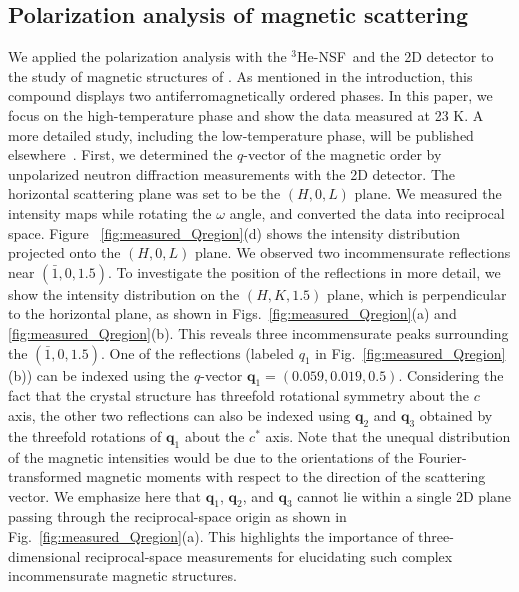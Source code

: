 \documentclass[%
 reprint,
superscriptaddress,
 amsmath,amssymb,
 aps,
floatfix,
]{revtex4-2}
\newcommand{\Hensf}{$^3$He-NSF}
\begin{document}
\subsection{Polarization analysis of magnetic scattering}
We applied the polarization analysis with the \Hensf~and the 2D detector to the study of magnetic structures of .
As mentioned in the introduction, this compound displays two antiferromagnetically ordered phases.
In this paper, we focus on the high-temperature phase and show the data measured at 23 K.
A more detailed study, including the low-temperature phase, will be published elsewhere~\cite{Osawa_tbp}.
First, we determined the $q$-vector of the magnetic order by unpolarized neutron diffraction measurements with the 2D detector.
The horizontal scattering plane was set to be the $(H,0,L)$ plane.
We measured the intensity maps while rotating the $\omega$ angle, and converted the data into reciprocal space.
Figure ~\ref{fig:measured_Qregion}(d) shows the intensity distribution projected onto the $(H,0,L)$ plane.
We observed two incommensurate reflections near $(\bar{1},0,1.5)$.
To investigate the position of the reflections in more detail, we show the intensity distribution on the $(H,K,1.5)$ plane, which is perpendicular to the horizontal plane, as shown in Figs.~\ref{fig:measured_Qregion}(a) and \ref{fig:measured_Qregion}(b).
This reveals three incommensurate peaks surrounding the $(\bar{1},0,1.5)$.
One of the reflections (labeled $q_1$ in Fig.~\ref{fig:measured_Qregion}(b)) can be indexed using the $q$-vector $\boldsymbol{q}_1 = (0.059, 0.019, 0.5)$.
Considering the fact that the crystal structure has threefold rotational symmetry about the $c$ axis, the other two reflections can also be indexed using $\boldsymbol{q}_2$ and $\boldsymbol{q}_3$ obtained by the threefold rotations of $\boldsymbol{q}_1$ about the $c^*$ axis.
Note that the unequal distribution of the magnetic intensities would be due to the orientations of the Fourier-transformed magnetic moments with respect to the direction of the scattering vector.
We emphasize here that $\boldsymbol{q}_1$, $\boldsymbol{q}_2$, and $\boldsymbol{q}_3$ cannot lie within a single 2D plane passing through the reciprocal-space origin as shown in Fig.~\ref{fig:measured_Qregion}(a).
This highlights the importance of three-dimensional reciprocal-space measurements for elucidating such complex incommensurate magnetic structures. %
\end{document}
